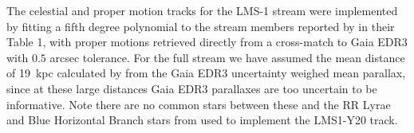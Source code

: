 The celestial and proper motion tracks for the LMS-1 stream were implemented by fitting a fifth degree polynomial to the stream members reported by \citet{Malhan2021} in their Table 1, with proper motions retrieved directly from a cross-match to Gaia EDR3 with $0.5$ arcsec tolerance. For the full stream we have assumed the mean distance of 19~kpc  calculated  by \citet{Malhan2021} from the Gaia EDR3 uncertainty weighed mean parallax, since at these large distances Gaia EDR3 parallaxes are too uncertain to be informative. Note there are no common stars between these and the RR Lyrae and Blue Horizontal Branch stars from \citet{Yuan2020} used to implement the LMS1-Y20 track. 
